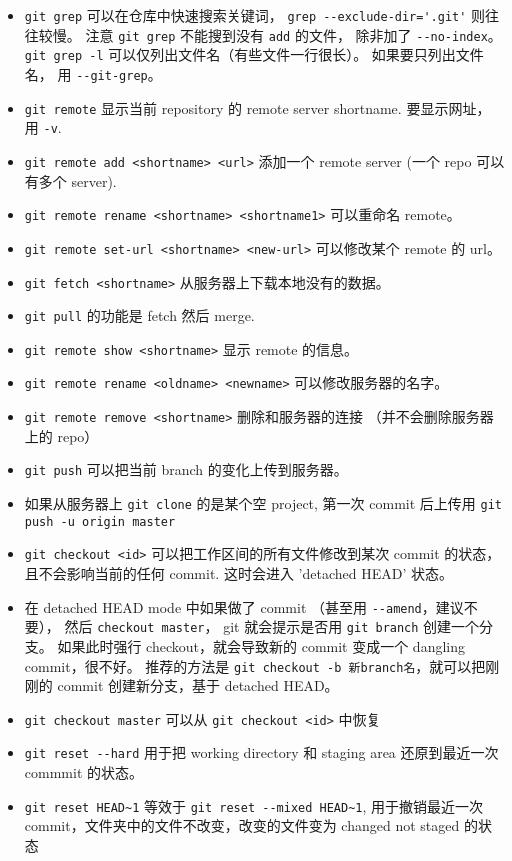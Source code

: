 \begin{itemize}
\item \verb|git grep| 可以在仓库中快速搜索关键词， \verb|grep --exclude-dir='.git'| 则往往较慢。 注意 \verb|git grep| 不能搜到没有 \verb|add| 的文件， 除非加了 \verb|--no-index|。 \verb|git grep -l| 可以仅列出文件名（有些文件一行很长）。 如果要只列出文件名， 用 \verb`--git-grep`。
\item \verb|git remote| 显示当前 repository 的 remote server shortname. 要显示网址， 用 \verb|-v|.
\item \verb|git remote add <shortname> <url>| 添加一个 remote server (一个 repo 可以有多个 server).
\item \verb|git remote rename <shortname> <shortname1>| 可以重命名 remote。
\item \verb|git remote set-url <shortname> <new-url>| 可以修改某个 remote 的 url。
\item \verb|git fetch <shortname>| 从服务器上下载本地没有的数据。
\item \verb|git pull| 的功能是 fetch 然后 merge.
\item \verb|git remote show <shortname>| 显示 remote 的信息。
\item \verb|git remote rename <oldname> <newname>| 可以修改服务器的名字。
\item \verb|git remote remove <shortname>| 删除和服务器的连接 （并不会删除服务器上的 repo）
\item \verb|git push| 可以把当前 branch 的变化上传到服务器。
\item 如果从服务器上 \verb|git clone| 的是某个空 project, 第一次 commit 后上传用 \verb|git push -u origin master|
\item \verb|git checkout <id>| 可以把工作区间的所有文件修改到某次 commit 的状态， 且不会影响当前的任何 commit. 这时会进入 'detached HEAD' 状态。
\item 在 detached HEAD mode 中如果做了 commit （甚至用 \verb|--amend|，建议不要）， 然后 \verb|checkout master|， git 就会提示是否用 \verb|git branch| 创建一个分支。 如果此时强行 checkout，就会导致新的 commit 变成一个 dangling commit，很不好。 推荐的方法是 \verb`git checkout -b 新branch名`，就可以把刚刚的 commit 创建新分支，基于 detached HEAD。
\item \verb|git checkout master| 可以从 \verb|git checkout <id>| 中恢复
\item \verb|git reset --hard| 用于把 working directory 和 staging area 还原到最近一次 commmit 的状态。
\item \verb|git reset HEAD~1| 等效于 \verb|git reset --mixed HEAD~1|, 用于撤销最近一次 commit，文件夹中的文件不改变，改变的文件变为 changed not staged 的状态

\end{itemize}
